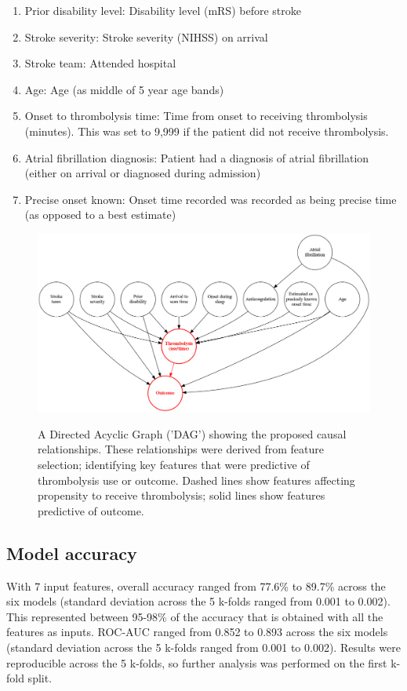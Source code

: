 \begin{enumerate}
    \item Prior disability level: Disability level (mRS) before stroke
    \item Stroke severity: Stroke severity (NIHSS) on arrival
    \item Stroke team: Attended hospital
    \item Age: Age (as middle of 5 year age bands)
    \item Onset to thrombolysis time: Time from onset to receiving thrombolysis (minutes). This was set to 9,999 if the patient did not receive thrombolysis.
    \item Atrial fibrillation diagnosis: Patient had a diagnosis of atrial fibrillation (either on arrival or diagnosed during admission)
    \item Precise onset known: Onset time recorded was recorded as being precise time (as opposed to a best estimate)
\end{enumerate}

\begin{figure}[!h]
    \centering%
      \includegraphics[width=0.80\linewidth]{./images/thrombolysis_dag.png}\\
  \caption{A Directed Acyclic Graph ('DAG') showing the proposed causal relationships. These relationships were derived from feature selection; identifying key features that were predictive of thrombolysis use or outcome. Dashed lines show features affecting propensity to receive thrombolysis; solid lines show features predictive of outcome.}
    \label{fig:single_waterfall_with_ivt}
\end{figure}


\subsection{Model accuracy}

With 7 input features, overall accuracy ranged from 77.6\% to 89.7\% across the six models (standard deviation across the 5 k-folds ranged from 0.001 to 0.002). This represented between 95-98\% of the accuracy that is obtained with all the features as inputs. ROC-AUC ranged from 0.852 to 0.893 across the six models (standard deviation across the 5 k-folds ranged from 0.001 to 0.002). Results were reproducible across the 5 k-folds, so further analysis was performed on the first k-fold split.


